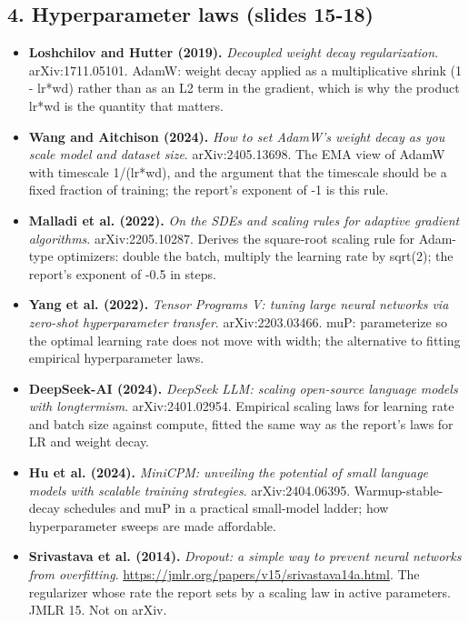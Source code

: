 \documentclass[11pt,letterpaper]{article}
\begin{document}
\subsection*{4. Hyperparameter laws (slides 15-18)}
\begin{itemize}[leftmargin=1.2em,itemsep=3pt]\sloppy
\item \textbf{Loshchilov and Hutter (2019).} \textit{Decoupled weight decay regularization}. arXiv:1711.05101. AdamW: weight decay applied as a multiplicative shrink (1 - lr*wd) rather than as an L2 term in the gradient, which is why the product lr*wd is the quantity that matters.
\item \textbf{Wang and Aitchison (2024).} \textit{How to set AdamW's weight decay as you scale model and dataset size}. arXiv:2405.13698. The EMA view of AdamW with timescale 1/(lr*wd), and the argument that the timescale should be a fixed fraction of training; the report's exponent of -1 is this rule.
\item \textbf{Malladi et al. (2022).} \textit{On the SDEs and scaling rules for adaptive gradient algorithms}. arXiv:2205.10287. Derives the square-root scaling rule for Adam-type optimizers: double the batch, multiply the learning rate by sqrt(2); the report's exponent of -0.5 in steps.
\item \textbf{Yang et al. (2022).} \textit{Tensor Programs V: tuning large neural networks via zero-shot hyperparameter transfer}. arXiv:2203.03466. muP: parameterize so the optimal learning rate does not move with width; the alternative to fitting empirical hyperparameter laws.
\item \textbf{DeepSeek-AI (2024).} \textit{DeepSeek LLM: scaling open-source language models with longtermism}. arXiv:2401.02954. Empirical scaling laws for learning rate and batch size against compute, fitted the same way as the report's laws for LR and weight decay.
\item \textbf{Hu et al. (2024).} \textit{MiniCPM: unveiling the potential of small language models with scalable training strategies}. arXiv:2404.06395. Warmup-stable-decay schedules and muP in a practical small-model ladder; how hyperparameter sweeps are made affordable.
\item \textbf{Srivastava et al. (2014).} \textit{Dropout: a simple way to prevent neural networks from overfitting}. \url{https://jmlr.org/papers/v15/srivastava14a.html}. The regularizer whose rate the report sets by a scaling law in active parameters. JMLR 15. Not on arXiv.
\end{itemize}
\end{document}
